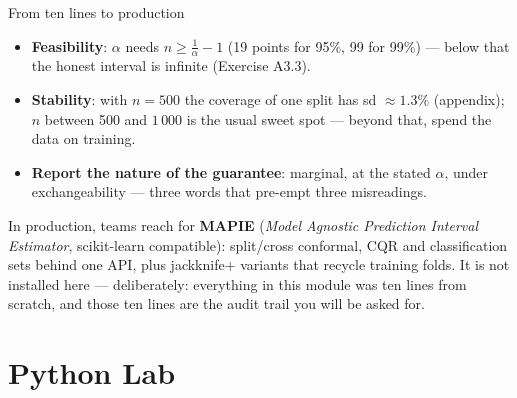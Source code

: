 \documentclass[aspectratio=169,11pt]{beamer}
\begin{document}
\begin{frame}{From ten lines to production}
  \begin{readme}
    \begin{itemize}
      \item \textbf{Feasibility}: $\alpha$ needs $n \ge \tfrac{1}{\alpha} - 1$
            (19 points for 95\%, 99 for 99\%) --- below that the honest interval is
            infinite (Exercise A3.3).
      \item \textbf{Stability}: with $n = 500$ the coverage of one split has sd
            $\approx 1.3\%$ (appendix); $n$ between 500 and $1\,000$ is the usual
            sweet spot --- beyond that, spend the data on training.
      \item \textbf{Report the nature of the guarantee}: marginal, at the stated
            $\alpha$, under exchangeability --- three words that pre-empt three
            misreadings.
    \end{itemize}
  \end{readme}
  \begin{industry}
    In production, teams reach for \textbf{MAPIE} (\emph{Model Agnostic Prediction
    Interval Estimator}, scikit-learn compatible): split/cross conformal,
    CQR and classification sets behind one API, plus jackknife+ variants that recycle
    training folds. It is not installed here --- deliberately: everything in this
    module was ten lines from scratch, and those ten lines are the audit trail you
    will be asked for.
  \end{industry}
\end{frame}

\section{Python Lab}
\end{document}
